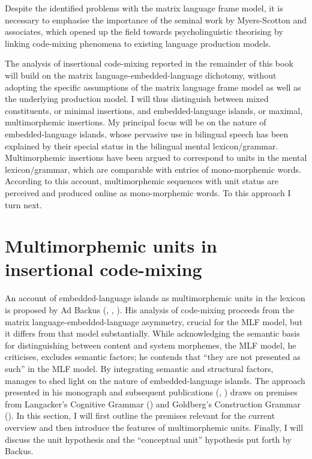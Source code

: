 Despite the identified problems with the matrix language frame model, it is necessary to emphasise the importance of the seminal work by Myers-Scotton and associates, which opened up the field towards psycholinguistic theorising by linking code-mixing phenomena to existing language production models.

The analysis of insertional code-mixing reported in the remainder of this book will build on the matrix language-embedded-language dichotomy, without adopting the specific assumptions of the matrix language frame model as well as the underlying production model. I will thus distinguish between mixed constituents, or minimal insertions, and embedded-language islands, or maximal, multimorphemic insertions. My principal focus will be on the nature of em\-bed\-ded-lan\-guage islands, whose pervasive use in bilingual speech has been explained by their special status in the bilingual mental lexicon/grammar. Multimorphemic insertions have been argued to correspond to units in the  mental lexicon/grammar, which are comparable with entries of mono-morphemic words. According to this account, multimorphemic sequences with unit status are perceived and produced online as mono-morphemic words. To this approach I turn next.

\section{Multimorphemic units in insertional code-mixing}{\label{unit-hypothesis}}
An account of embedded-language islands as multimorphemic units in the lexicon is proposed by Ad Backus (\citeyear{backus-two-1996}, \citeyear{backus-evidence-1999}, \citeyear{backus-units-2003}). His analysis of code-mixing proceeds from the matrix language-embedded-language asymmetry, crucial for the MLF model, but it differs from that model substantially. While acknowledging the semantic basis for distinguishing between content and system morphemes, the MLF model, he criticises, excludes semantic factors; he contends that ``they are not presented as such'' \citep[115]{backus-two-1996} in the MLF model. By integrating semantic and structural factors, \citet{backus-evidence-1999, backus-units-2003} manages to shed light on the nature of embedded-language islands. The approach presented in his \citeyear{backus-two-1996} monograph and subsequent publications (\citeyear{backus-evidence-1999}, \citeyear{backus-units-2003}) draws on premises from Langacker's Cognitive Grammar (\citeyear{langacker-foundations-1987,langacker-foundations-1991}) and Goldberg's Construction Grammar (\citeyear{goldberg-1995}). In this section, I will first outline the premises relevant for the current overview and then introduce the features of multimorphemic units. Finally, I will discuss the unit hypothesis and the ``conceptual unit'' hypothesis put forth by Backus.

